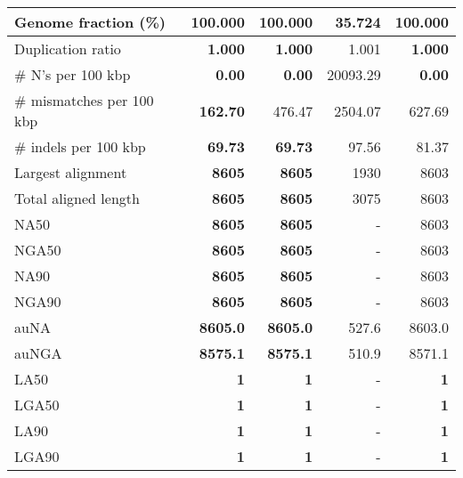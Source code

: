 \documentclass[12pt,a4paper]{article}
\begin{document}
\begin{table}[ht]
\begin{center}
\begin{tabular}{|l*{4}{|r}|}
Genome fraction (\%) & {\bf 100.000} & {\bf 100.000} & 35.724 & {\bf 100.000} \\ \hline
Duplication ratio & {\bf 1.000} & {\bf 1.000} & 1.001 & {\bf 1.000} \\ \hline
\# N's per 100 kbp & {\bf 0.00} & {\bf 0.00} & 20093.29 & {\bf 0.00} \\ \hline
\# mismatches per 100 kbp & {\bf 162.70} & 476.47 & 2504.07 & 627.69 \\ \hline
\# indels per 100 kbp & {\bf 69.73} & {\bf 69.73} & 97.56 & 81.37 \\ \hline
Largest alignment & {\bf 8605} & {\bf 8605} & 1930 & 8603 \\ \hline
Total aligned length & {\bf 8605} & {\bf 8605} & 3075 & 8603 \\ \hline
NA50 & {\bf 8605} & {\bf 8605} & - & 8603 \\ \hline
NGA50 & {\bf 8605} & {\bf 8605} & - & 8603 \\ \hline
NA90 & {\bf 8605} & {\bf 8605} & - & 8603 \\ \hline
NGA90 & {\bf 8605} & {\bf 8605} & - & 8603 \\ \hline
auNA & {\bf 8605.0} & {\bf 8605.0} & 527.6 & 8603.0 \\ \hline
auNGA & {\bf 8575.1} & {\bf 8575.1} & 510.9 & 8571.1 \\ \hline
LA50 & {\bf 1} & {\bf 1} & - & {\bf 1} \\ \hline
LGA50 & {\bf 1} & {\bf 1} & - & {\bf 1} \\ \hline
LA90 & {\bf 1} & {\bf 1} & - & {\bf 1} \\ \hline
LGA90 & {\bf 1} & {\bf 1} & - & {\bf 1} \\ \hline
\end{tabular}
\end{center}
\end{table}
\end{document}
